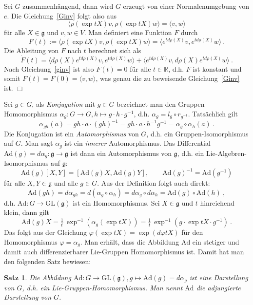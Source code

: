 \documentclass[12pt,a4paper]{article}
\def\R{\mathbb{R}}
\def\GL{\mathrm{GL}}
\def\Ad{\mathrm{Ad}}
\def\g{\mathfrak{g}}
\def\la{\langle}
\def\ra{\rangle}
\newtheorem{Satz}[Lemma]{Satz}
\def\qed{\quad\hfill\ensuremath{\Box}}
\begin{document}
\medskip

Sei $G$ zusammenh\"angend, dann wird $G$ erzeugt von einer Normalenumgebung von $e$.
Die Gleichung~\ref{Ginv} folgt also aus
$$
 \la \rho(\exp tX)v, \rho(\exp tX)w \ra  = \la v, w \ra
$$
f\"ur alle $X\in \g$ und $v, w \in V$. Man definiert eine Funktion $F$ durch
$$
F(t) :=  \la \rho(\exp tX)v, \rho(\exp tX )w \ra = \la e^{td\rho(X)}v, e^{td\rho(X)}w  \ra \ .
$$
Die Ableitung von $F$ nach $t$ berechnet sich als
$$
\dot F(t) = \la d\rho(X) e^{td\rho(X)}v, e^{td\rho(X)}w  \ra + \la e^{td\rho(X)}v, d\rho(X) e^{td\rho(X)}w  \ra \ .
$$
Nach Gleichung~\ref{ginv} ist also $\dot F(t) = 0$ f\"ur alle $t\in \R$, d.h. $F$ ist konstant und
somit $F(t) = F(0) = \la v, w \ra $, was genau die zu beweisende Gleichung~\ref{Ginv} ist.
\qed


\bigskip

Sei $g\in G$,  als {\it Konjugation} mit $g\in G$ bezeichnet man den Gruppen-Homomorphismus
$\alpha_g : G \rightarrow G, h \mapsto g\cdot h \cdot g^{-1}$, d.h. $\alpha_g = l_g \circ r_{g^{-1}}$.
Tats\"achlich gilt
$$
\alpha_{gh}(a) = gh \cdot a \cdot (gh)^{-1} = g h \cdot a \cdot h^{-1} g^{-1} = \alpha_g \circ \alpha_h (a) \ .
$$
Die Konjugation ist ein {\it Automorphismus} von $G$, d.h. ein Gruppen-Isomorphismus auf $G$. Man
sagt $\alpha_g$ ist ein {\it innerer} Automorphismus. Das Differential $\Ad(g)=d\alpha_g : \g \rightarrow \g$
ist dann ein Automorphismus von $\g$, d.h. ein Lie-Algebren-Isomorphismus auf $\g$:
$$
\Ad(g) [X, Y] = [\Ad(g)X, \Ad(g)Y], \qquad \Ad(g)^{-1} = \Ad(g^{-1})
$$
f\"ur alle $X,Y\in \g$ und alle $g\in G$. Aus der Definition folgt auch direkt:
$$
\Ad(gh) = d\alpha_{gh} = d(\alpha_g \circ \alpha_h) = d\alpha_g \circ d\alpha_h = \Ad(g) \circ \Ad(h) \ ,
$$
d.h. $\Ad : G \rightarrow \GL(\g)$ ist ein Homomorphismus. Sei $X\in \g$ und $t$ hinreichend klein, dann gilt
$$
\Ad(g)X = \tfrac1t \,\exp^{-1} (\alpha_g(\exp tX)) = \tfrac1t \, \exp^{-1}(g \cdot \exp tX \cdot g^{-1}) \ .
$$
Das folgt aus der Gleichung $\varphi(\exp tX)= \exp(d\varphi tX)$ f\"ur den Homomorphismus $\varphi = \alpha_g$.
Man erh\"alt, dass die Abbildung $\Ad$ ein stetiger und damit auch differenzierbarer Lie-Gruppen Homomorphismus
ist. Damit hat man den folgenden Satz bewiesen:

\bigskip

\begin{Satz}\label{Ad}
Die Abbildung $\Ad : G \rightarrow \GL(\g), g \mapsto \Ad(g)=d\alpha_g$ ist eine Darstellung von $G$, d.h.
ein Lie-Gruppen-Homomorphismus. Man nennt $\Ad$ die {\em adjungierte Darstellung} von $G$.
\end{Satz}
\end{document}
